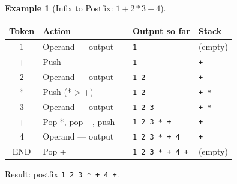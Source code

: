 \documentclass[11pt, a4paper, notitlepage]{report}
\theoremstyle{definition}
\theoremstyle{remark}
\theoremstyle{definition}
\newtheorem{example}[theorem]{Example}
\begin{document}
\begin{example}[Infix to Postfix: $1 + 2 * 3 + 4$]
\label{ex:infix-to-postfix-simple}

\begin{center}
\begin{tabularx}{\linewidth}{@{} c X X X @{}}
\toprule
\textbf{Token} & \textbf{Action} & \textbf{Output so far} & \textbf{Stack} \\
\midrule
1     & Operand --- output          & \texttt{1}               & (empty) \\
+     & Push                        & \texttt{1}               & \texttt{+} \\
2     & Operand --- output          & \texttt{1 2}             & \texttt{+} \\
*     & Push (* > +)                & \texttt{1 2}             & \texttt{+ *} \\
3     & Operand --- output          & \texttt{1 2 3}           & \texttt{+ *} \\
+     & Pop *, pop +, push +        & \texttt{1 2 3 * +}       & \texttt{+} \\
4     & Operand --- output          & \texttt{1 2 3 * + 4}     & \texttt{+} \\
END   & Pop +                       & \texttt{1 2 3 * + 4 +}   & (empty) \\
\bottomrule
\end{tabularx}
\end{center}

Result: postfix \texttt{1 2 3 * + 4 +}.
\end{example}
\end{document}
